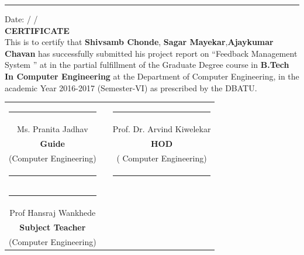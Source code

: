 \documentclass[12 pt,a4paper]{report}
\begin{document}
\begin{center}
\vspace{1.0 cm}
\rule{\textwidth}{2 pt}
\flushleft
\flushleft Date:\hspace{6 pt} / \hspace{5 pt} /
\\
\center\textbf{CERTIFICATE}
\\
\vspace{1 cm}
\justify
This is to certify that \textbf{Shivsamb Chonde}, \textbf{Sagar Mayekar},\textbf{Ajaykumar Chavan} has successfully submitted his project report on “Feedback Management System ” at in the partial fulfillment of the Graduate Degree course in\textbf{ B.Tech In Computer Engineering} at the Department of Computer Engineering, in the academic Year 2016-2017 (Semester-VI) as prescribed by the DBATU.\\

{\vspace{1in}}
    \vfill
    \begin{tabular}{ccc}
      \rule{5cm}{1sp} & \rule{12mm}{0pt} & \rule{5cm}{1sp} \\
{Ms. Pranita Jadhav} &&{Prof. Dr. Arvind Kiwelekar} \\
      {\textbf{Guide}} && {\textbf{HOD}}\\ 
      {(Computer Engineering)}&& {( Computer Engineering)}\\  
{\vspace{1in}}        
\rule{5cm}{0sp} & \rule{12mm}{0pt} & \rule{5cm}{0sp} \\          
\rule{5cm}{1sp} & \rule{12mm}{0pt} & \rule{0cm}{1sp} \\
{Prof Hansraj Wankhede} \\
      {\textbf{Subject Teacher}} \\ 
      {(Computer Engineering)}  
 
    
      \end{tabular} 
\end{center}
\end{document}
